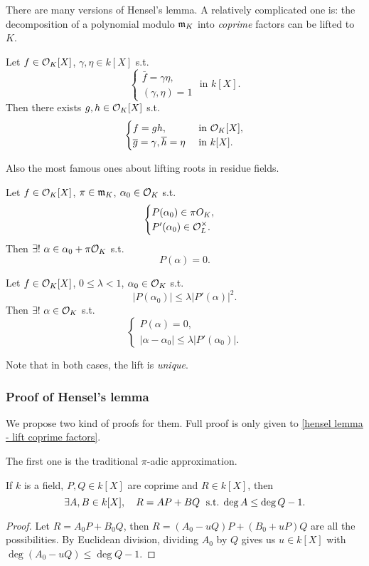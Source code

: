 There are many versions of Hensel's lemma.
A relatively complicated one is: the decomposition of a polynomial modulo $\mathfrak{m}_K$ into \textit{coprime} factors can be lifted to $K$.
\begin{theorem}
    \label{hensel lemma - lift coprime factors}
    Let $f\in\mathcal{O}_K[X]$, $\gamma, \eta\in k[X]$
    s.t. \[\begin{cases}
        \bar{f} = \gamma\eta,\\
        (\gamma, \eta) = 1
    \end{cases}\text{  in }k[X].\]
    Then there exists $g, h\in\mathcal{O}_K[X]$ s.t.\[\begin{cases}
        f = gh, &\text{ in } \mathcal{O}_K[X],\\
        \overline{g} = \gamma, \overline{h} = \eta &\text{ in } k[X].
    \end{cases}\]
\end{theorem}
Also the most famous ones about lifting roots in residue fields.
\begin{theorem}
    \label{hensel lemma - lift simple root}
    Let $f\in \mathcal{O}_K[X]$, $\pi\in\mathfrak{m}_K$, $\alpha_0\in \mathcal{O}_K$ s.t. \[\begin{cases}
        P(\alpha_0)\in\pi O_K,\\ 
        P'(\alpha_0)\in\mathcal{O}_L^\times.
    \end{cases}\]
    Then $\exists !\ \alpha\in \alpha_0 + \pi\O_K$ s.t. \[P(\alpha) = 0.\]
\end{theorem}
\begin{theorem}
    \label{hensel lemma - variant}
    Let $f\in\mathcal{O}_K[X]$, $0\le \lambda < 1$,
    $\alpha_0\in\mathcal{O}_K$ s.t. \[|P(\alpha_0)|\le \lambda |P'(\alpha)|^2.\]
    Then $\exists!\ \alpha\in\mathcal{O}_K$ s.t. \[\begin{cases}
        P(\alpha) = 0,\\ 
        |\alpha - \alpha_0| \le\lambda |P'(\alpha_0)|.
    \end{cases}\]
\end{theorem}
Note that in both cases, the lift is \textit{unique}.

\subsubsection*{Proof of Hensel's lemma}
We propose two kind of proofs for them. Full proof is only given to \cref{hensel lemma - lift coprime factors}.

The first one is the traditional $\pi$-adic approximation.
\begin{lemma}\label{bezout with deg condition}
    If $k$ is a field, $P, Q\in k[X]$ are coprime and $R\in k[X]$,
    then \[\exists A, B\in k[X],\quad R = AP + BQ\ \;\mathrm{s.t.}\; \deg A\le \deg Q - 1.\]
\end{lemma}
\begin{proof}
    Let $R = A_0P + B_0Q$, then $R = (A_0 - uQ)P + (B_0 + uP)Q$ are all the possibilities.
    By Euclidean division, dividing $A_0$ by $Q$ gives us $u\in k[X]$ with $\deg (A_0 - uQ)\le \deg Q - 1$. 
\end{proof}

